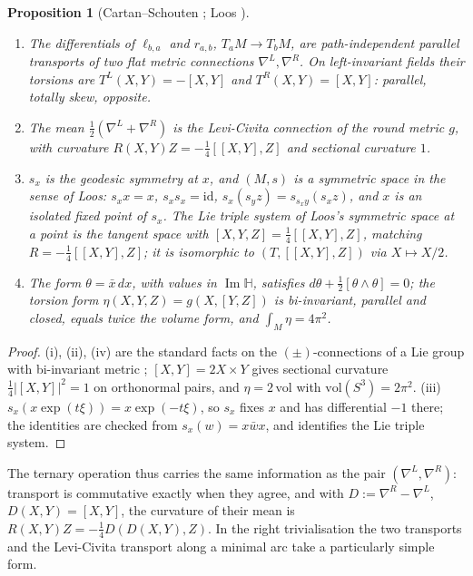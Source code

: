 \documentclass[11pt,reqno]{amsart}
\newtheorem{proposition}[theorem]{Proposition}
\theoremstyle{definition}
\theoremstyle{remark}
\numberwithin{equation}{section}
\newcommand{\HH}{\mathbb{H}}
\newcommand{\im}{\operatorname{Im}}
\begin{document}
\begin{proposition}[Cartan--Schouten \cite{CS}; Loos \cite{Loos}]\label{prop:conn}
\begin{enumerate}[label=(\roman*)]
\item The differentials of $\ell_{b,a}$ and $r_{a,b}$, $T_aM\to T_bM$, are path-independent parallel
transports of two flat metric connections $\nabla^L,\nabla^R$.  On left-invariant fields their torsions
are $T^L(X,Y)=-[X,Y]$ and $T^R(X,Y)=[X,Y]$: parallel, totally skew, opposite.
\item The mean $\tfrac12(\nabla^L+\nabla^R)$ is the Levi-Civita connection of the round metric $g$, with
curvature $R(X,Y)Z=-\tfrac14[[X,Y],Z]$ and sectional curvature $1$.
\item $s_x$ is the geodesic symmetry at $x$, and $(M,s)$ is a symmetric space in the sense of Loos:
$s_xx=x$, $s_xs_x=\mathrm{id}$, $s_x(s_yz)=s_{s_xy}(s_xz)$, and $x$ is an isolated fixed point of $s_x$.
The Lie triple system of Loos's symmetric space at a point is the tangent space with $[X,Y,Z]=\tfrac14[[X,Y],Z]$, matching
$R=-\tfrac14[[X,Y],Z]$; it is isomorphic to $(T,[[X,Y],Z])$ via $X\mapsto X/2$.
\item The form $\theta=\bar x\,dx$, with values in $\im\HH$, satisfies
$d\theta+\tfrac12[\theta\wedge\theta]=0$; the torsion form $\eta(X,Y,Z)=g(X,[Y,Z])$ is bi-invariant, parallel and closed, equals twice the volume form,
and $\int_M\eta=4\pi^2$.
\end{enumerate}
\end{proposition}
\begin{proof}
(i), (ii), (iv) are the standard facts on the $(\pm)$-connections of a Lie group with bi-invariant metric
\cite{CS,Milnor}; $[X,Y]=2X\times Y$ gives sectional curvature $\tfrac14\lvert[X,Y]\rvert^2=1$ on orthonormal
pairs, and $\eta=2\,\mathrm{vol}$ with $\mathrm{vol}(S^3)=2\pi^2$.  (iii) $s_x(x\exp(t\xi))=x\exp(-t\xi)$, so
$s_x$ fixes $x$ and has differential $-1$ there; the identities are checked from $s_x(w)=x\bar wx$, and
\cite{Loos} identifies the Lie triple system.
\end{proof}

The ternary operation thus carries the same information as the pair $(\nabla^L,\nabla^R)$: transport is
commutative exactly when they agree, and with $D:=\nabla^R-\nabla^L$, $D(X,Y)=[X,Y]$, the curvature of
their mean is $R(X,Y)Z=-\tfrac14D(D(X,Y),Z)$.  In the right trivialisation the two transports and the
Levi-Civita transport along a minimal arc take a particularly simple form.
\end{document}
